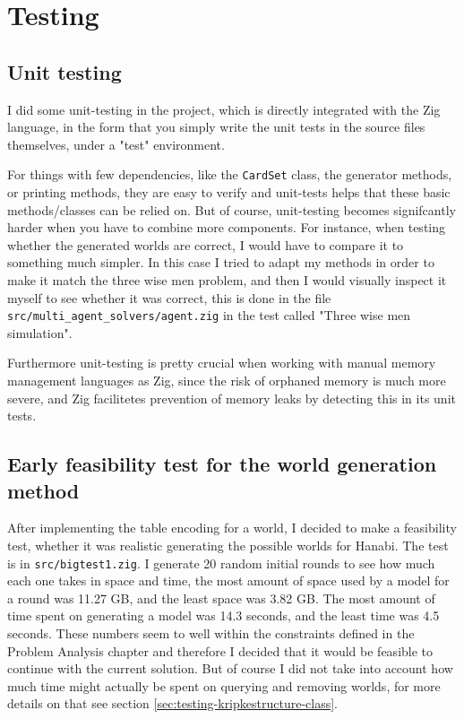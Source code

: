 \section{Testing}
\subsection{Unit testing}
I did some unit-testing in the project, which is directly integrated with the Zig language, in the form that you simply write the unit tests in the source files themselves, under a "test" environment. 

For things with few dependencies, like the {\tt CardSet} class, the generator methods, or printing methods, they are easy to verify and unit-tests helps that these basic methods/classes can be relied on. But of course, unit-testing becomes signifcantly harder when you have to combine more components. For instance, when testing whether the generated worlds are correct, I would have to compare it to something much simpler. In this case I tried to adapt my methods in order to make it match the three wise men problem, and then I would visually inspect it myself to see whether it was correct, this is done in the file {\tt src/multi\_agent\_solvers/agent.zig} in the test called "Three wise men simulation".

Furthermore unit-testing is pretty crucial when working with manual memory management languages as Zig, since the risk of orphaned memory is much more severe, and Zig facilitetes prevention of memory leaks by detecting this in its unit tests. 


\subsection{Early feasibility test for the world generation method}
After implementing the table encoding for a world, I decided to make a feasibility test, whether it was realistic generating the possible worlds for Hanabi. The test is in {\tt src/bigtest1.zig}. I generate 20 random initial rounds to see how much each one takes in space and time, the most amount of space used by a model for a round was 11.27 GB, and the least space was 3.82 GB. The most amount of time spent on generating a model was 14.3 seconds, and the least time was 4.5 seconds.
These numbers seem to well within the constraints defined in the Problem Analysis chapter and therefore I decided that it would be feasible to continue with the current solution. But of course I did not take into account how much time might actually be spent on querying and removing worlds, for more details on that see section \ref{sec:testing-kripkestructure-class}.

